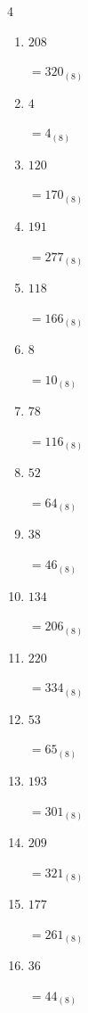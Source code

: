 \begin{multicols}{4}
\begin{enumerate}
  \item $208$

        $=320_{(8)}$

\columnbreak %

  \item $4$

        $=4_{(8)}$

  \item $120$

        $=170_{(8)}$

  \item $191$

        $=277_{(8)}$

  \item $118$

        $=166_{(8)}$

  \item $8$

        $=10_{(8)}$

  \item $78$

        $=116_{(8)}$

  \item $52$

        $=64_{(8)}$

  \item $38$

        $=46_{(8)}$

  \item $134$

        $=206_{(8)}$

  \item $220$

        $=334_{(8)}$

  \item $53$

        $=65_{(8)}$

  \item $193$

        $=301_{(8)}$

  \item $209$

        $=321_{(8)}$

  \item $177$

        $=261_{(8)}$

  \item $36$

        $=44_{(8)}$

\columnbreak %


\end{enumerate}
\end{multicols}
